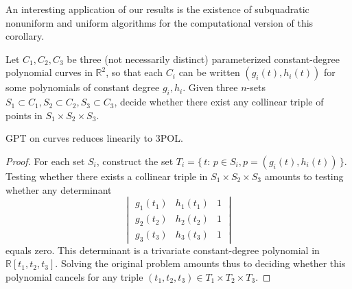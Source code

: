 An interesting application of our results is the existence of subquadratic
nonuniform and uniform algorithms for the computational version of
this corollary.
\begin{problem}
	Let $C_1, C_2, C_3$ be three (not necessarily distinct) parameterized
	constant-degree polynomial curves in $\mathbb{R}^2$, so that each
	$C_i$ can be written $(g_i(t),h_i(t))$ for some polynomials of
	constant degree $g_i,h_i$.
	Given three $n$-sets $S_1 \subset C_1, S_2 \subset C_2, S_3
	\subset C_3$, decide whether there exist any collinear
	triple of points in $S_1 \times S_2 \times S_3$.
\end{problem}
\begin{theorem}\label{thm:gpt-to-3pol}
	 GPT on curves reduces linearily to 3POL\@.
\end{theorem}
\begin{proof}
For each set $S_i$, construct the set $T_i = \{\,t
\colon\, p \in S_i, p = (g_{i}(t),h_{i}(t))\,\}$.
Testing whether there exists a collinear triple
in $
S_1 \times S_2 \times S_3$ amounts to testing whether any determinant
\begin{displaymath}
\begin{vmatrix}
g_1(t_1)&h_1(t_1)&1\\
g_2(t_2)&h_2(t_2)&1\\
g_3(t_3)&h_3(t_3)&1
\end{vmatrix}
\end{displaymath}
equals zero.
This determinant is a trivariate constant-degree polynomial in
$\mathbb{R}[t_1,t_2,t_3]$.
Solving the original problem amounts thus to deciding whether this polynomial
cancels for any triple $(t_1,t_2,t_3) \in T_1 \times T_2 \times T_3$.
\end{proof}

